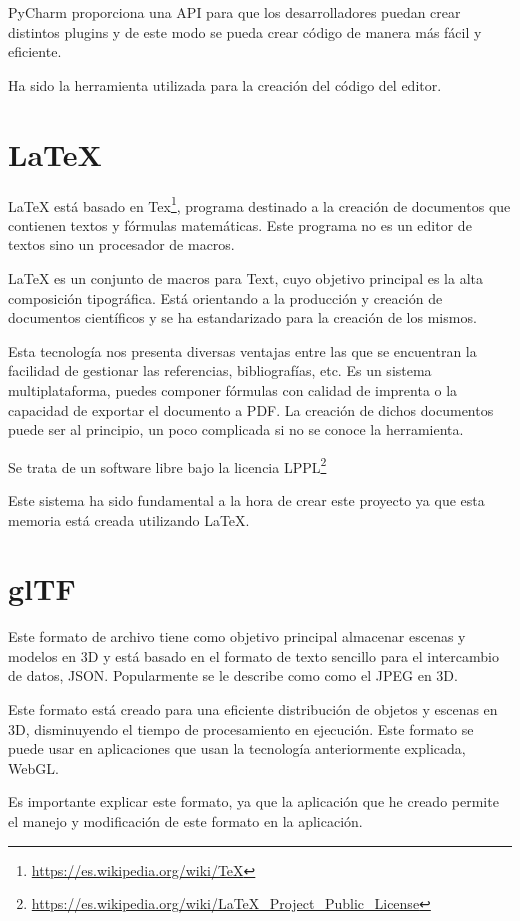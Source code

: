 \documentclass[a4paper, 12pt]{book}
\begin{document}
PyCharm proporciona una API para que los desarrolladores puedan crear distintos plugins y de este modo se pueda crear código de manera más fácil y eficiente.

Ha sido la herramienta utilizada para la creación del código del editor.

\section{LaTeX} %
\label{sec:Latex}
LaTeX está basado en Tex\footnote{\url{https://es.wikipedia.org/wiki/TeX}}, programa destinado a la creación de documentos que contienen textos y fórmulas matemáticas. Este programa no es un editor de textos sino un procesador de macros.

LaTeX es un conjunto de macros para Text, cuyo objetivo principal es la alta composición tipográfica. Está orientando a la producción y creación de documentos científicos y se ha estandarizado para la creación de los mismos.

Esta tecnología nos presenta diversas ventajas entre las que se encuentran la facilidad de gestionar las referencias, bibliografías, etc. Es un sistema multiplataforma, puedes componer fórmulas con calidad de imprenta o la capacidad de exportar el documento a PDF. La creación de dichos documentos puede ser al principio, un poco complicada si no se conoce la herramienta.

Se trata de un software libre bajo la licencia LPPL\footnote{\url{https://es.wikipedia.org/wiki/LaTeX_Project_Public_License}} 

Este sistema ha sido fundamental a la hora de crear este proyecto ya que esta memoria está creada utilizando LaTeX.

\section{glTF} %
\label{sec:Gltfs}
Este formato de archivo tiene como objetivo principal almacenar escenas y modelos en 3D y está basado en el formato de texto sencillo para el intercambio de datos, JSON. Popularmente se le describe como como el JPEG en 3D.

Este formato está creado para una eficiente distribución de objetos y escenas en 3D, disminuyendo el tiempo de procesamiento en ejecución. Este formato se puede usar en aplicaciones que usan la tecnología anteriormente explicada, WebGL.

Es importante explicar este formato, ya que la aplicación que he creado permite el manejo y  modificación de este formato en la aplicación.
\end{document}
